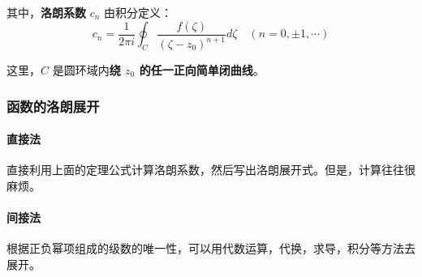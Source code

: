 其中，\textbf{洛朗系数} \(c_n\) 由积分定义：
\[
c_n = \frac{1}{2\pi i} \oint_C \frac{f(\zeta)}{(\zeta - z_0)^{n+1}} d\zeta \quad (n = 0, \pm 1, \cdots)
\]

这里，\(C\) 是圆环域内\textbf{绕 \(z_0\) 的任一正向简单闭曲线}。
\subsubsection{函数的洛朗展开}
\label{函数的洛朗展开}
\paragraph{直接法}
\label{直接法-1}
直接利用上面的定理公式计算洛朗系数，然后写出洛朗展开式。但是，计算往往很麻烦。
\paragraph{间接法}
\label{间接法-1}
根据正负幂项组成的级数的唯一性，可以用代数运算，代换，求导，积分等方法去展开。
